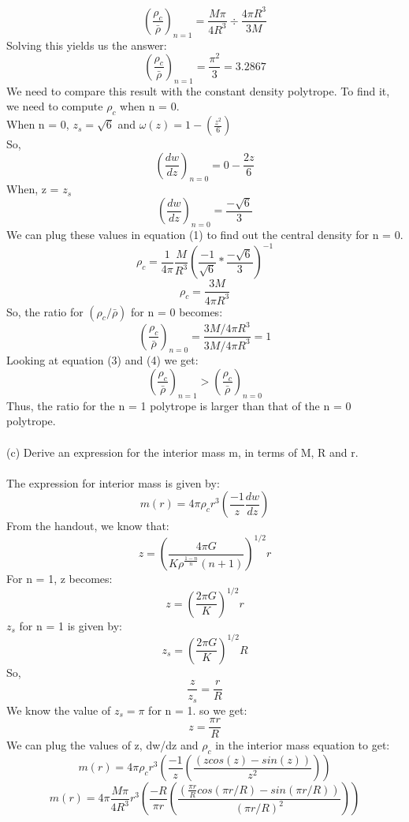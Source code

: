 \documentclass[10pt]{article}
\begin{document}
\[ \left(\frac{\rho_{c}}{\bar{\rho}}\right)_{n = 1} = \frac{M \pi}{4 R^3} \div \frac{4 \pi R^3}{3 M}\]
Solving this yields us the answer:
\begin{equation}
    \left(\frac{\rho_{c}}{\bar{\rho}}\right)_{n = 1} = \frac{\pi^{2}}{3} = 3.2867  \tag{3}
\end{equation}
We need to compare this result with the constant density polytrope. To find it, we need to compute $\rho_{c}$ when n = 0.\\
When n = 0, $z_{s} = \sqrt{6}$ and $\omega(z) = 1 - \left( \frac{z^2}{6}\right)$ \\
So, 
\[ \left( \frac{dw}{dz}\right)_{n=0} = 0 - \frac{2z}{6}\]
When, z = $z_{s}$
\[ \left( \frac{dw}{dz}\right)_{n=0} = \frac{- \sqrt{6}}{3}\]
We can plug these values in equation (1) to find out the central density for n = 0.
\[ \rho_{c} = \frac{1}{4 \pi} \frac{M}{R^3} \left( \frac{-1}{\sqrt{6}} *\frac{-\sqrt{6}}{3}\right)^{-1}\]
\[ \rho_{c} = \frac{3M}{4 \pi R^3}\]
So, the ratio for $(\rho_{c}/\bar{\rho})$ for n = 0 becomes:
\begin{equation}
       \left( \frac{\rho_{c}}{\bar{\rho}}\right)_{n=0} = \frac{3M/4\pi R^3}{3M/4\pi R^3}  = 1 \tag{4}
\end{equation}
Looking at equation (3) and (4) we get:
\[ \left(\frac{\rho_{c}}{\bar{\rho}}\right)_{n = 1} > \left( \frac{\rho_{c}}{\bar{\rho}}\right)_{n=0}\]
Thus, the ratio for the n = 1 polytrope is larger than that of the n = 0 polytrope.
\\ \\
(c) Derive an expression for the interior mass m, in terms of M, R and r. \\ \\
The expression for interior mass is given by:
\[ m(r) = 4 \pi \rho_{c} r^3 \left( \frac{-1}{z} \frac{dw}{dz}\right)\]
From the handout, we know that:
\[ z = \left( \frac{4 \pi G}{K \rho^{\frac{1-n}{n}} (n+1)}\right)^{1/2} r\]
For n = 1, z becomes:
\[ z = \left( \frac{2 \pi G}{K}\right)^{1/2} r\]
$z_{s}$ for n = 1 is given by:
\[ z_{s} = \left( \frac{2 \pi G}{K}\right)^{1/2} R\]
So,
\[ \frac{z}{z_{s}} = \frac{r}{R}\]
We know the value of $z_{s} = \pi$ for n = 1. so we get:
\[ z = \frac{\pi r}{R}\] 
We can plug the values of z, dw/dz and $\rho_{c}$ in the interior mass equation to get:
\[ m(r) = 4 \pi \rho_{c} r^3 \left( \frac{-1}{z} \left( \frac{(z cos(z) - sin(z))}{z^2}\right)\right)\]
\[ m(r) = 4 \pi \frac{M \pi}{4 R^3} r^3 \left( \frac{-R}{\pi r} \left( \frac{(\frac{\pi r}{R} cos(\pi r/R) - sin(\pi r / R))}{(\pi r / R)^{2}}\right)\right)\]
\end{document}
